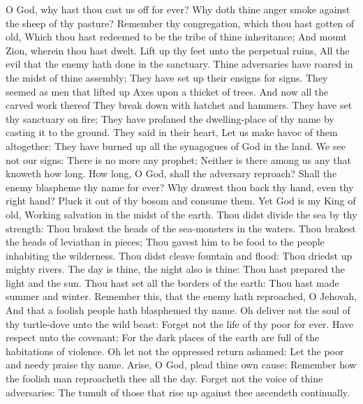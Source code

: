 O God, why hast thou cast us off for ever? Why doth thine anger smoke against the sheep of thy pasture?  Remember thy congregation, which thou hast gotten of old, Which thou hast redeemed to be the tribe of thine inheritance; And mount Zion, wherein thou hast dwelt.  Lift up thy feet unto the perpetual ruins, All the evil that the enemy hath done in the sanctuary.  Thine adversaries have roared in the midst of thine assembly; They have set up their ensigns for signs.  They seemed as men that lifted up Axes upon a thicket of trees.  And now all the carved work thereof They break down with hatchet and hammers.  They have set thy sanctuary on fire; They have profaned the dwelling-place of thy name by casting it to the ground.  They said in their heart, Let us make havoc of them altogether: They have burned up all the synagogues of God in the land.  We see not our signs: There is no more any prophet; Neither is there among us any that knoweth how long.  How long, O God, shall the adversary reproach? Shall the enemy blaspheme thy name for ever?  Why drawest thou back thy hand, even thy right hand? Pluck it out of thy bosom and consume them.  Yet God is my King of old, Working salvation in the midst of the earth.  Thou didst divide the sea by thy strength: Thou brakest the heads of the sea-monsters in the waters.  Thou brakest the heads of leviathan in pieces; Thou gavest him to be food to the people inhabiting the wilderness.  Thou didst cleave fountain and flood: Thou driedst up mighty rivers.  The day is thine, the night also is thine: Thou hast prepared the light and the sun.  Thou hast set all the borders of the earth: Thou hast made summer and winter.  Remember this, that the enemy hath reproached, O Jehovah, And that a foolish people hath blasphemed thy name.  Oh deliver not the soul of thy turtle-dove unto the wild beast: Forget not the life of thy poor for ever.  Have respect unto the covenant; For the dark places of the earth are full of the habitations of violence.  Oh let not the oppressed return ashamed: Let the poor and needy praise thy name.  Arise, O God, plead thine own cause: Remember how the foolish man reproacheth thee all the day.  Forget not the voice of thine adversaries: The tumult of those that rise up against thee ascendeth continually. 

